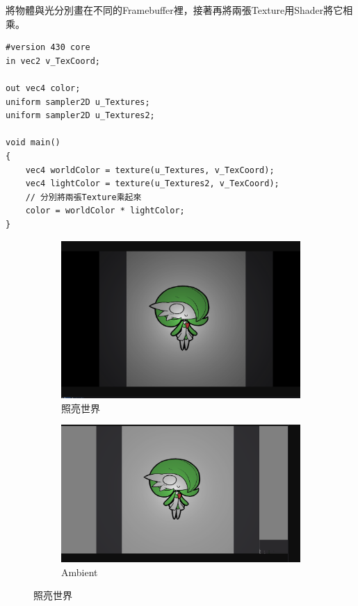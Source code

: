 將物體與光分別畫在不同的Framebuffer裡，接著再將兩張Texture用Shader將它相乘。

\begin{lstlisting}
#version 430 core
in vec2 v_TexCoord;

out vec4 color;
uniform sampler2D u_Textures;
uniform sampler2D u_Textures2;

void main()
{
    vec4 worldColor = texture(u_Textures, v_TexCoord);
    vec4 lightColor = texture(u_Textures2, v_TexCoord);
    // 分別將兩張Texture乘起來
    color = worldColor * lightColor;
}
\end{lstlisting}

\begin{figure}[h]
    \begin{subfigure}[b]{0.5\linewidth}
        \includegraphics[width=\linewidth]{./resources/2D-Lighting/Light.png} 
        \caption{照亮世界}
    \end{subfigure}
    \begin{subfigure}[b]{0.5\linewidth}
        \includegraphics[width=\linewidth]{./resources/2D-Lighting/Ambient.png}
        \caption{Ambient}
    \end{subfigure}
\caption{照亮世界}
\label{fig:Light}
\end{figure}

